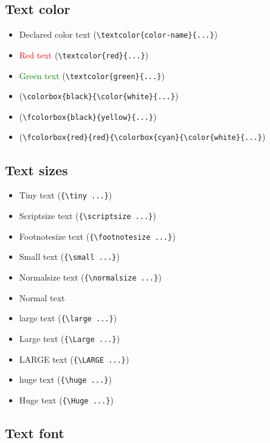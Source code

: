 \documentclass{article}				%
\begin{document}
\subsection{Text color}

\begin{itemize}
	\item \textcolor{color-name}{Declared color text} (\verb|\textcolor{color-name}{...}|)
	\item \textcolor{red}{Red text} (\verb|\textcolor{red}{...}|)
	\item \textcolor{green}{Green text} (\verb|\textcolor{green}{...}|)
	\item \colorbox{black}{\color{white}{White text on black}} (\verb|\colorbox{black}{\color{white}{...}|)
	\item {} (\verb|\fcolorbox{black}{yellow}{...}|)
	\item {} (\verb|\fcolorbox{red}{red}{\colorbox{cyan}{\color{white}{...}|)
\end{itemize}

\subsection{Text sizes}

\begin{itemize}
	\item {\tiny Tiny text} (\verb|{\tiny ...}|)
	\item {\scriptsize Scriptsize text} (\verb|{\scriptsize ...}|)
	\item {\footnotesize Footnotesize text} (\verb|{\footnotesize ...}|)
	\item {\small Small text} (\verb|{\small ...}|)
	\item {\normalsize Normalsize text} (\verb|{\normalsize ...}|)
	\item Normal text
	\item {\large large text} (\verb|{\large ...}|)
	\item {\Large Large text} (\verb|{\Large ...}|)
	\item {\LARGE LARGE text} (\verb|{\LARGE ...}|)
	\item {\huge huge text} (\verb|{\huge ...}|)
	\item {\Huge Huge text} (\verb|{\Huge ...}|)
\end{itemize}

\subsection{Text font}
\end{document}

